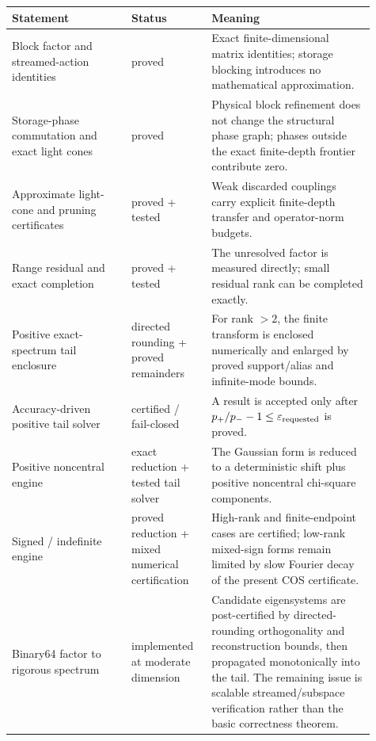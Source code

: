 \documentclass[11pt]{article}
\theoremstyle{definition}
\theoremstyle{remark}
\begin{document}
\begin{center}
\small
\begin{tabular}{@{}p{0.30\linewidth}p{0.20\linewidth}p{0.41\linewidth}@{}}
\toprule
Statement & Status & Meaning\\
\midrule
Block factor and streamed-action identities &
proved &
Exact finite-dimensional matrix identities; storage blocking introduces no
mathematical approximation.\\

Storage-phase commutation and exact light cones &
proved &
Physical block refinement does not change the structural phase graph; phases
outside the exact finite-depth frontier contribute zero.\\

Approximate light-cone and pruning certificates &
proved + tested &
Weak discarded couplings carry explicit finite-depth transfer and
operator-norm budgets.\\

Range residual and exact completion &
proved + tested &
The unresolved factor is measured directly; small residual rank can be
completed exactly.\\

Positive exact-spectrum tail enclosure &
directed rounding + proved remainders &
For rank \(>2\), the finite transform is enclosed numerically and enlarged by
proved support/alias and infinite-mode bounds.\\

Accuracy-driven positive tail solver &
certified / fail-closed &
A result is accepted only after
\(p_+/p_- - 1\le\varepsilon_{\rm requested}\) is proved.\\

Positive noncentral engine &
exact reduction + tested tail solver &
The Gaussian form is reduced to a deterministic shift plus positive
noncentral chi-square components.\\

Signed / indefinite engine &
proved reduction + mixed numerical certification &
High-rank and finite-endpoint cases are certified; low-rank mixed-sign forms
remain limited by slow Fourier decay of the present COS certificate.\\

Binary64 factor to rigorous spectrum &
implemented at moderate dimension &
Candidate eigensystems are post-certified by directed-rounding orthogonality
and reconstruction bounds, then propagated monotonically into the tail.  The
remaining issue is scalable streamed/subspace verification rather than the
basic correctness theorem.\\
\bottomrule
\end{tabular}
\end{center}
\end{document}
